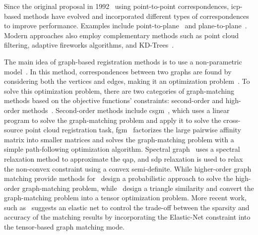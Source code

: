 Since the original proposal in 1992~\cite{a-method-for-registration-of-3-d-shapes} using point-to-point correspondences, \gls{icp}-based methods have evolved and incorporated different types of correspondences to improve performance. Examples include point-to-plane~\cite{object-modelling-by-registration-of-multiple-range-images} and plane-to-plane~\cite{generalized-icp}. Modern approaches also employ complementary methods such as point cloud filtering, adaptive fireworks algorithms, and KD-Trees~\cite{improved-iterative-closest-point-icp-3d-point-cloud-registration-algorithm-based-on-point-cloud-filtering-and-adaptive-fireworks-for-coarse-registration}. \medskip

The main idea of graph-based registration methods is to use a non-parametric model~\cite{a-review-of-point-set-registration:-from-pairwise-registration-to-groupwise-registration}. In this method, correspondences between two graphs are found by considering both the vertices and edges, making it an optimization problem~\cite{a-review-of-point-set-registration:-from-pairwise-registration-to-groupwise-registration}. To solve this optimization problem, there are two categories of graph-matching methods based on the objective functions' constraints: second-order and high-order methods~\cite{the-graph-matching-problem}. Second-order methods include \gls{csgm}~\cite{a-systematic-approach-for-cross-source-point-cloud-registration-by-preserving-macro-and-micro-structures}, which uses a linear program to solve the graph-matching problem and apply it to solve the cross-source point cloud registration task, \gls{fgm}~\cite{factorized-graph-matching} factorizes the large pairwise affinity matrix into smaller matrices and solves the graph-matching problem with a simple path-following optimization algorithm. Spectral graph~\cite{a-spectral-technique-for-correspondence-problems-using-pairwise-constraints} uses a spectral relaxation method to approximate the \gls{qap}, and \gls{sdp} relaxation is used to relax the non-convex constraint using a convex semi-definite. While higher-order graph matching provide methods for~\cite{probabilistic-graph-and-hypergraph-matching} design a probabilistic approach to solve the high-order graph-matching problem, while~\cite{a-tensor-based-algorithm-for-high-order-graph-matching} design a triangle similarity and convert the graph-matching problem into a tensor optimization problem. More recent work, such as~\cite{elastic-net-constraint-based-tensor-model-for-high-order-graph-matching} suggests an elastic net to control the trade-off between the sparsity and accuracy of the matching results by incorporating the Elastic-Net constraint into the tensor-based graph matching mode. \medskip

